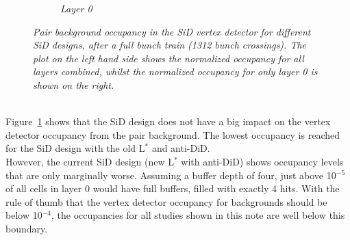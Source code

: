 \begin{figure}[!h]
\begin{subfigure}[t]{0.45\textwidth}
\caption{\textit{Layer 0}}
\end{subfigure}
\caption{\textit{Pair background occupancy in the SiD vertex detector for different SiD designs, after a full bunch train (1312 bunch crossings).
The plot on the left hand side shows the normalized occupancy for all layers combined, whilst the normalized occupancy for only layer 0 is shown on the right.}}
\label{fig:SiD_comparison}
\end{figure}
\\Figure~\ref{fig:SiD_comparison} shows that the SiD design does not have a big impact on the vertex detector occupancy from the pair background. 
The lowest occupancy is reached for the SiD design with the old L$^*$ and anti-DiD.\\
However, the current SiD design (new L$^*$ with anti-DiD) shows occupancy levels that are only marginally worse.
Assuming a buffer depth of four, just above 10$^{-5}$ of all cells in layer 0 would have full buffers, filled with exactly 4 hits.
With the rule of thumb that the vertex detector occupancy for backgrounds should be below 10$^{-4}$, the occupancies for all studies shown in this note are well below this boundary.